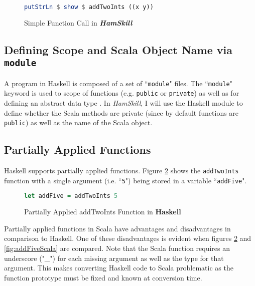 \documentclass{report}
\begin{document}
\begin{figure}[H]
\begin{mdframed}
\begin{lstlisting}[language=Haskell]
putStrLn $ show $ addTwoInts ((x y))
\end{lstlisting}
\end{mdframed}
\caption{Simple Function Call in \textbf{\emph{HamSkill}}}\label{fig:addTwoNumbersHamSkill}
\end{figure}

\subsection{Defining Scope and Scala Object Name via {\tt module}}

A program in Haskell is composed of a set of ``{\tt module}" files.  The ``{\tt module}" keyword is used to  scope of functions (e.g. {\tt public} or {\tt private}) as well as for defining an abstract data type \cite{haskellModule}.  In \emph{HamSkill}, I will use the Haskell module to define whether the Scala methods are private (since by default functions are {\tt public}) as well as the name of the Scala object.

\subsection{Partially Applied Functions}\label{partiallyAppliedFunctions}

Haskell supports partially applied functions.  Figure \ref{fig:addFiveHaskell} shows the {\tt addTwoInts} function with a single argument (i.e. ``{\tt 5}") being stored in a variable ``{\tt addFive}".  

\begin{figure}[H]
\begin{mdframed}
\begin{lstlisting}[language=Haskell]
let addFive = addTwoInts 5
\end{lstlisting}
\end{mdframed}
\caption{Partially Applied addTwoInts Function in \textbf{Haskell}}\label{fig:addFiveHaskell}
\end{figure}

Partially applied functions in Scala have advantages and disadvantages in comparison to Haskell.  One of these disadvantages is evident when figures \ref{fig:addFiveHaskell} and \ref{fig:addFiveScala} are compared.  Note that the Scala function requires an underscore ("\_") for each missing argument as well as the type for that argument.  This makes converting Haskell code to Scala problematic as the function prototype must be fixed and known at conversion time.  
\end{document}
